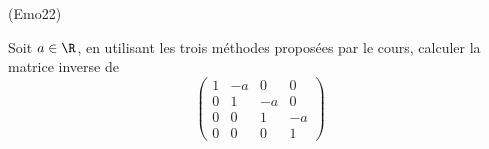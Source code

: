 \begin{tiny}(Emo22)\end{tiny} Soit $a\in\R$, en utilisant les trois méthodes proposées par le cours, calculer la matrice inverse de
\begin{displaymath}
 \begin{pmatrix}
  1 & -a & 0 & 0\\ 0 & 1 & -a & 0 \\ 0 & 0 & 1 & -a \\ 0 & 0 & 0 & 1
 \end{pmatrix}
\end{displaymath}
 